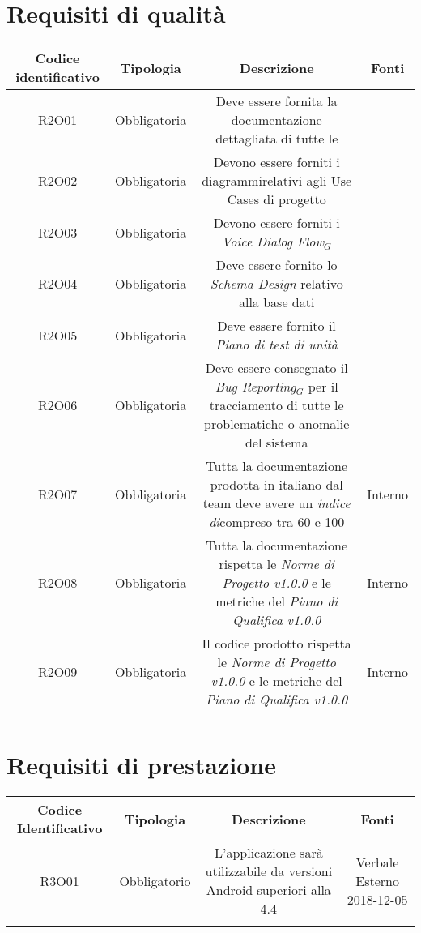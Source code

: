 \section{Requisiti di qualità}
\begin{tabularx}{\textwidth}{|C|C|C|C|}
	\hline
	\textbf{Codice identificativo}& \textbf{Tipologia} & \textbf{Descrizione} & \textbf{Fonti} \\
	\hline
	\endhead
	R2O01 & Obbligatoria &Deve essere fornita la documentazione dettagliata di tutte le  & \\
	\hline
	R2O02 &Obbligatoria & Devono essere forniti i diagrammirelativi agli Use Cases di progetto  & \\
	\hline
	R2O03 &Obbligatoria & Devono essere forniti i \textit{Voice Dialog Flow$_{G}$} & \\
	\hline
	R2O04 &Obbligatoria & Deve essere fornito lo \textit{Schema Design} relativo alla base dati  & \\
	\hline
	R2O05 &Obbligatoria & Deve essere fornito il \textit{Piano di test di unità} & \\
	\hline
	R2O06 &Obbligatoria & Deve essere consegnato il \textit{Bug Reporting$_{G}$} per il tracciamento di
	tutte le problematiche o anomalie del sistema & \\
	\hline
	R2O07 &Obbligatoria & Tutta la documentazione prodotta in italiano dal team deve avere
	un \textit{indice di}compreso tra 60 e 100 & Interno\\
	\hline
	R2O08 &Obbligatoria & Tutta la documentazione rispetta le \textit{Norme di Progetto v1.0.0} e le metriche del \textit{Piano di Qualifica v1.0.0}& Interno\\
	\hline
	R2O09 &Obbligatoria & Il codice prodotto rispetta le \textit{Norme di Progetto v1.0.0} e le metriche del \textit{Piano di Qualifica v1.0.0}& Interno\\
	\hline
    \caption{Tabella requisiti di qualità}
\end{tabularx}

\section{Requisiti di prestazione}
\begin{tabularx}{\textwidth}{|C|C|C|C|}
	\hline
	\textbf{Codice Identificativo}& \textbf{Tipologia} & \textbf{Descrizione} & \textbf{Fonti}\\
	\hline	
	\endhead
	R3O01&Obbligatorio  & L'applicazione sarà utilizzabile da versioni Android superiori alla 4.4 & Verbale Esterno 2018-12-05 \\
	\hline

	\caption{Tabella requisiti di prestazione}
\end{tabularx}



